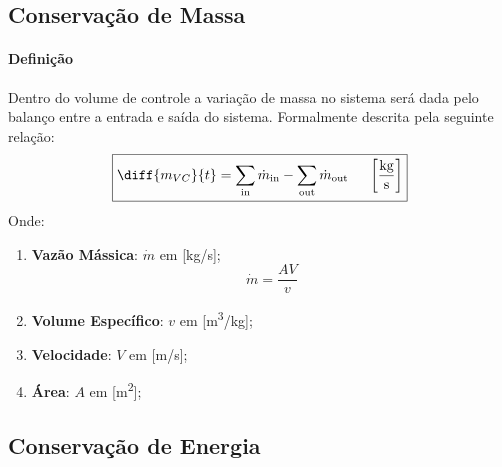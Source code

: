 \documentclass{article}
\begin{document}
        \subsection{Conservação de Massa}
            \paragraph{Definição}Dentro do volume de controle a variação de massa no sistema será dada pelo balanço entre a entrada e saída do sistema. Formalmente descrita pela seguinte relação:
                \[\boxed{
                    \diff{m_{VC}}{t} = \sum_\text{in}\dot{m}_\text{in} - \sum_\text{out}\dot{m}_\text{out} 
                                       \hspace{5mm} \left[\frac{\text{kg}}{\text{s}}\right]}\]
            Onde:
                \begin{enumerate}[noitemsep]
                    \item \textbf{Vazão Mássica}: $\dot{m}$ em [kg/s];
                        \[\boxed{\dot{m} = \frac{A V}{v}}\]
                    \item \textbf{Volume Específico}: $v$ em [m\textsuperscript{3}/kg];
                    \item \textbf{Velocidade}: $V$ em [m/s];
                    \item \textbf{Área}: $A$ em [m\textsuperscript{2}];
                \end{enumerate}

        \subsection{Conservação de Energia}
\end{document}
